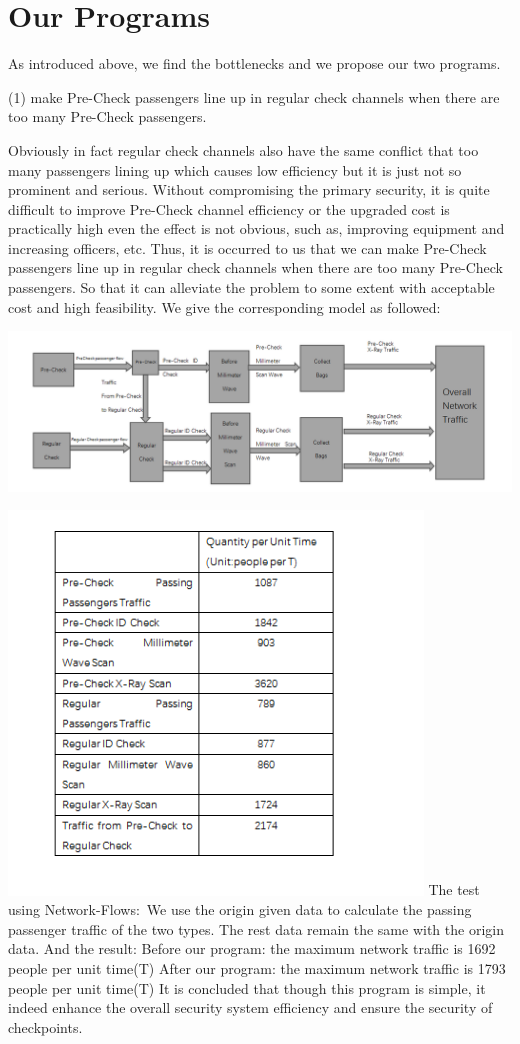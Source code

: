 \documentclass[12pt]{article}
\begin{document}
\section{Our Programs}

\setlength{\parindent}{2em}
As introduced above, we find the bottlenecks and we propose our two programs.

(1) make Pre-Check passengers line up in regular check channels when there are too many Pre-Check passengers.


Obviously in fact regular check channels also have the same conflict that too many passengers lining up which causes low efficiency but it is just not so prominent and serious. Without compromising the primary security, it is quite difficult to improve Pre-Check channel efficiency or the upgraded cost is practically high even the effect is not obvious, such as, improving equipment and increasing officers, etc. Thus, it is occurred to us that we can make Pre-Check passengers line up in regular check channels when there are too many Pre-Check passengers. So that it can alleviate the problem to some extent with acceptable cost and high feasibility. We give the corresponding model as followed$:$

\includegraphics[width=14cm]{m2.png}



\includegraphics[width=11cm]{p3.png}
The test using Network-Flows$:$
We use the origin given data to calculate the passing passenger traffic of the two types. The rest data remain the same with the origin data.
And the result:
       Before our program:  the maximum network traffic is 1692 people per unit time(T)
       After our program:  the maximum network traffic is 1793 people per unit time(T)
It is concluded that though this program is simple, it indeed enhance the overall security system efficiency and ensure the security of checkpoints.
\end{document}
